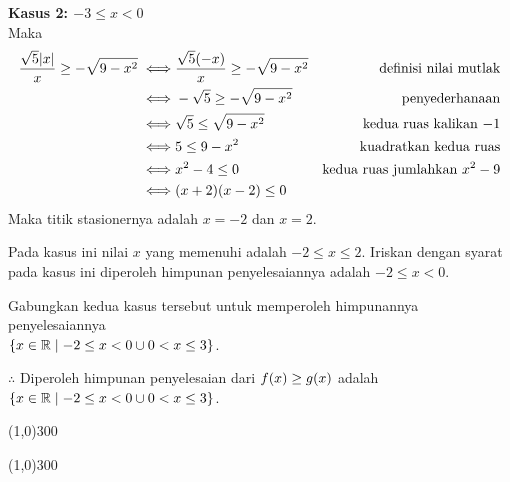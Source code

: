 \begin{enumerate}[leftmargin=*, label={\arabic*}.]
\begin{enumerate}[label={\alph*}.]
    \textbf{Kasus 2: $-3 \leq x < 0$}\\
    Maka
    \begin{align*}
        \frac{\sqrt{5}\abs{x}}{x} \geq -\sqrt{9-x^{2}}
        \iff &\frac{\sqrt{5}(-x)}{x} \geq -\sqrt{9-x^{2}} 
        &\text{definisi nilai mutlak} \\
        \iff &-\sqrt{5} \geq -\sqrt{9-x^{2}}
        &\text{penyederhanaan}\\
        \iff &\sqrt{5} \leq \sqrt{9-x^{2}}
        &\text{kedua ruas kalikan $-1$}\\
        \iff & 5 \leq 9-x^{2}
        &\text{kuadratkan kedua ruas}\\
        \iff &x^{2}-4 \leq 0
        &\text{kedua ruas jumlahkan $x^{2}-9$}\\
        \iff &(x+2)(x-2) \leq 0
    \end{align*}
    Maka titik stasionernya adalah $x=-2$ dan $x=2$.
    \begin{center}
        \end{center}
    Pada kasus ini nilai $x$ yang memenuhi adalah $-2 \leq x \leq 2$. Iriskan dengan syarat 
    pada kasus ini diperoleh himpunan penyelesaiannya adalah $-2 \leq x < 0$.

    Gabungkan kedua kasus tersebut untuk memperoleh himpunannya penyelesaiannya \\
    $\set*{x \in \mathbb{R} \mid -2 \leq x < 0 \cup 0 < x \leq 3}$.

    $\therefore$ Diperoleh himpunan penyelesaian dari $\ds f(x) \geq g(x)$ adalah 
    $\set*{x \in \mathbb{R} \mid -2 \leq x < 0 \cup 0 < x \leq 3}$.
\begin{center}
    \line(1,0){300}
\end{center}
\end{enumerate}

\end{enumerate}

\begin{center}
    \line(1,0){300}
\end{center}